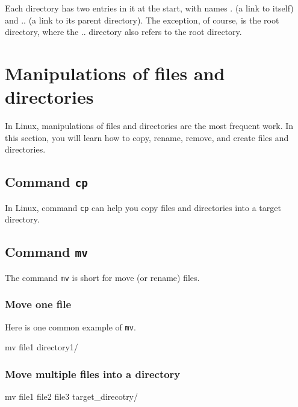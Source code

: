 \documentclass[]{book}
\makeatletter
\newenvironment{Shaded}{\begin{snugshade}}{\end{snugshade}}
\newcommand{\FunctionTok}[1]{\textcolor[rgb]{0.00,0.00,0.00}{#1}}
\newcommand{\NormalTok}[1]{#1}
\newenvironment{kframe}{%
\medskip{}
\setlength{\fboxsep}{.8em}
 \def\at@end@of@kframe{}%
 \ifinner\ifhmode%
  \def\at@end@of@kframe{\end{minipage}}%
  \begin{minipage}{\columnwidth}%
 \fi\fi%
 \def\FrameCommand##1{\hskip\@totalleftmargin \hskip-\fboxsep
 \colorbox{shadecolor}{##1}\hskip-\fboxsep
     \hskip-\linewidth \hskip-\@totalleftmargin \hskip\columnwidth}%
 \MakeFramed {\advance\hsize-\width
   \@totalleftmargin\z@ \linewidth\hsize
   \@setminipage}}%
 {\par\unskip\endMakeFramed%
 \at@end@of@kframe}
\renewenvironment{Shaded}{\begin{kframe}}{\end{kframe}}
\theoremstyle{definition}
\theoremstyle{definition}
\theoremstyle{definition}
\theoremstyle{remark}
\makeatother
\begin{document}
Each directory has two entries in it at the start, with names . (a link
to itself) and .. (a link to its parent directory). The exception, of
course, is the root directory, where the .. directory also refers to the
root directory.

\section{Manipulations of files and
directories}\label{manipulations-of-files-and-directories}

In Linux, manipulations of files and directories are the most frequent
work. In this section, you will learn how to copy, rename, remove, and
create files and directories.

\subsection{\texorpdfstring{Command
\texttt{cp}}{Command cp}}\label{command-cp}

In Linux, command \texttt{cp} can help you copy files and directories
into a target directory.

\subsection{\texorpdfstring{Command
\texttt{mv}}{Command mv}}\label{command-mv}

The command \texttt{mv} is short for move (or rename) files.

\subsubsection{Move one file}\label{move-one-file}

Here is one common example of \texttt{mv}.

\begin{Shaded}
\begin{Highlighting}[]

\FunctionTok{mv}\NormalTok{ file1 directory1/}
\end{Highlighting}
\end{Shaded}

\subsubsection{Move multiple files into a
directory}\label{move-multiple-files-into-a-directory}

\begin{Shaded}
\begin{Highlighting}[]
\FunctionTok{mv}\NormalTok{ file1 file2 file3 target_direcotry/}
\end{Highlighting}
\end{Shaded}
\end{document}
